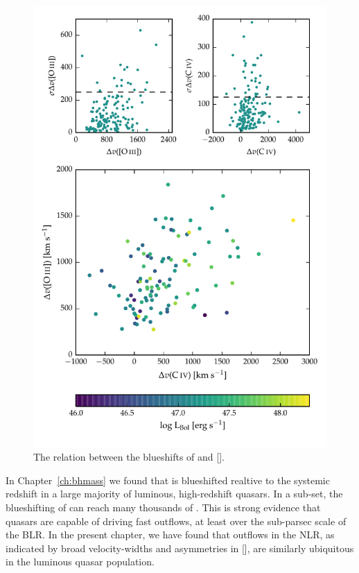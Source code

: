 \begin{figure}
\centering 
    \includegraphics[width=\columnwidth]{figures/chapter04/civ_blueshift_oiii_blueshift.pdf} 
    \caption[{The relation between the blueshifts of  and [].}]{The relation between the blueshifts of  and [].}     
    \label{fig:oiii_civ_blueshifts}
\end{figure}

In Chapter~\ref{ch:bhmass} we found that  is blueshifted realtive to the systemic redshift in a large majority of luminous, high-redshift quasars. 
In a sub-set, the blueshifting of  can reach many thousands of \kms. 
This is strong evidence that quasars are capable of driving fast outflows, at least over the sub-parsec scale of the BLR. 
In the present chapter, we have found that outflows in the NLR, as indicated by broad velocity-widths and asymmetries in [], are similarly ubiquitous in the luminous quasar population. 

